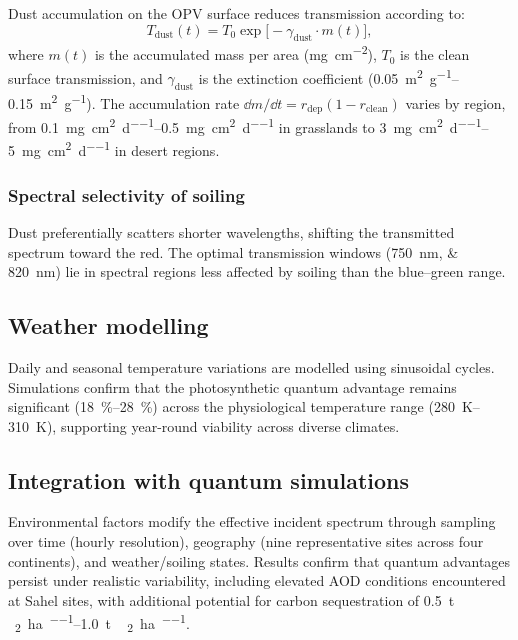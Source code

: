 \documentclass[11pt,a4paper]{article}
\begin{document}
Dust accumulation on the OPV surface reduces transmission according to:
\begin{equation}
T_{\mathrm{dust}}(t) = T_0 \exp\!\bigl[-\gamma_{\mathrm{dust}} \cdot m(t)\bigr],
\end{equation}
where $m(t)$ is the accumulated mass per area (\si{\milli\gram\per\centi\metre\squared}), $T_0$ is the clean surface transmission, and $\gamma_{\mathrm{dust}}$ is the extinction coefficient (\SIrange{0.05}{0.15}{\metre\squared\per\gram}). The accumulation rate $\dd{m}/\dd{t} = r_{\mathrm{dep}} (1 - r_{\mathrm{clean}})$ varies by region, from \SIrange{0.1}{0.5}{\milli\gram\per\centi\metre\squared\per\day} in grasslands to \SIrange{3}{5}{\milli\gram\per\centi\metre\squared\per\day} in desert regions.

\subsubsection{Spectral selectivity of soiling}

Dust preferentially scatters shorter wavelengths, shifting the transmitted spectrum toward the red. The optimal transmission windows (\SIlist{750;820}{\nano\meter}) lie in spectral regions less affected by soiling than the blue--green range.

\subsection{Weather modelling}

Daily and seasonal temperature variations are modelled using sinusoidal cycles. Simulations confirm that the photosynthetic quantum advantage remains significant (\SIrange{18}{28}{\percent}) across the physiological temperature range (\SIrange{280}{310}{\kelvin}), supporting year-round viability across diverse climates.

\subsection{Integration with quantum simulations}

Environmental factors modify the effective incident spectrum through sampling over time (hourly resolution), geography (nine representative sites across four continents), and weather/soiling states. Results confirm that quantum advantages persist under realistic variability, including elevated AOD conditions encountered at Sahel sites, with additional potential for carbon sequestration of \SIrange{0.5}{1.0}{\tonne\,_2\per\hectare\per\yr}.
\end{document}
